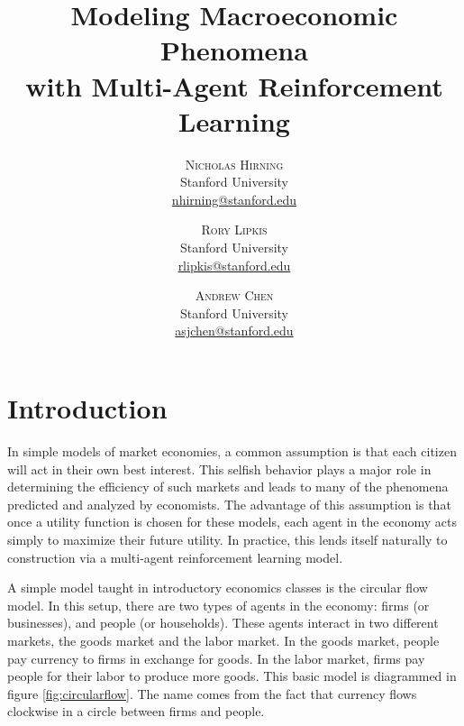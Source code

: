 \documentclass[twoside,twocolumn]{article}
\title{Modeling Macroeconomic Phenomena \\with Multi-Agent Reinforcement Learning} %
\author{%
\textsc{Nicholas Hirning} \\[1ex]
\normalsize Stanford University \\ 
\normalsize \href{mailto:nhirning@stanford.edu}{nhirning@stanford.edu}
\and
\textsc{Rory Lipkis} \\[1ex]
\normalsize Stanford University \\ 
\normalsize \href{mailto:rlipkis@stanford.edu}{rlipkis@stanford.edu}
\and
\textsc{Andrew Chen} \\[1ex]
\normalsize Stanford University \\ 
\normalsize \href{mailto:asjchen@stanford.edu}{asjchen@stanford.edu}
}
\date{} %
\begin{document}
\maketitle


\section{Introduction}

In simple models of market economies, a common assumption is that each citizen will act in their own best interest. This selfish behavior plays a major role in determining the efficiency of such markets and leads to many of the phenomena predicted and analyzed by economists. The advantage of this assumption is that once a utility function is chosen for these models, each agent in the economy acts simply to maximize their future utility. In practice, this lends itself naturally to construction via a multi-agent reinforcement learning model. 

\medskip

A simple model taught in introductory economics classes is the circular flow model. In this setup, there are two types of agents in the economy: firms (or businesses), and people (or households). These agents interact in two different markets, the goods market and the labor market. In the goods market, people pay currency to firms in exchange for goods. In the labor market, firms pay people for their labor to produce more goods. This basic model is diagrammed in figure \ref{fig:circularflow}. The name comes from the fact that currency flows clockwise in a circle between firms and people.
\end{document}
